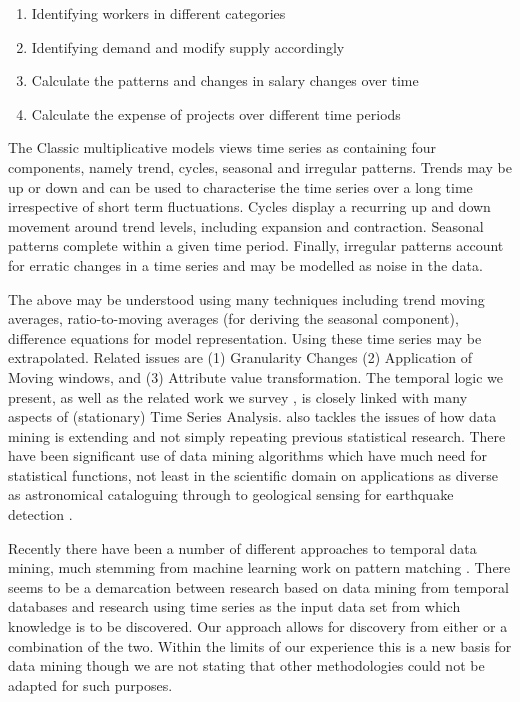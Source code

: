 \begin{enumerate}
\item Identifying workers in different categories 
\item Identifying demand and modify supply accordingly
\item Calculate the patterns and changes in salary changes over time
\item Calculate the expense of projects over different time periods
\end{enumerate}

The Classic multiplicative models views time series as containing four
components, namely trend, cycles, seasonal and irregular patterns.
Trends may be up or down and can be used to characterise the time
series over a long time irrespective of short term fluctuations.
Cycles display a recurring up and down movement around trend levels,
including expansion and contraction. Seasonal patterns complete within
a given time period. Finally, irregular patterns account for erratic
changes in a time series and may be modelled as noise in the data.
\smallskip

The above may be understood using many techniques including trend moving averages, ratio-to-moving averages (for deriving
the seasonal component), difference equations for model
representation. Using these time series may be extrapolated.
Related issues are (1) Granularity Changes (2) Application of Moving
windows, and (3) Attribute value transformation. The temporal logic we
present, as well as the related work we survey
\cite{frm94,lai93,alss95,dgm97,dlm98}, is closely linked with many
aspects of (stationary) Time Series Analysis. \cite{gmp97} also
tackles the issues of how data mining is extending and not simply
repeating previous statistical research. There have been significant
use of data mining algorithms which have much need for statistical
functions, not least in the scientific domain on applications as
diverse as astronomical cataloguing through to geological sensing for
earthquake detection \cite{fhs96}.

\medskip

Recently there have been a number of different approaches to temporal
data mining, much stemming from machine learning work on pattern
matching \cite{lai93,alss95}. There seems to be a demarcation between research based on
data mining from temporal databases and research using time series as
the input data set from which knowledge is to be discovered. Our
approach allows for discovery from either or a combination of the
two. Within the limits of our experience this is a new basis for data
mining though we are not stating that other methodologies could not be
adapted for such purposes.

